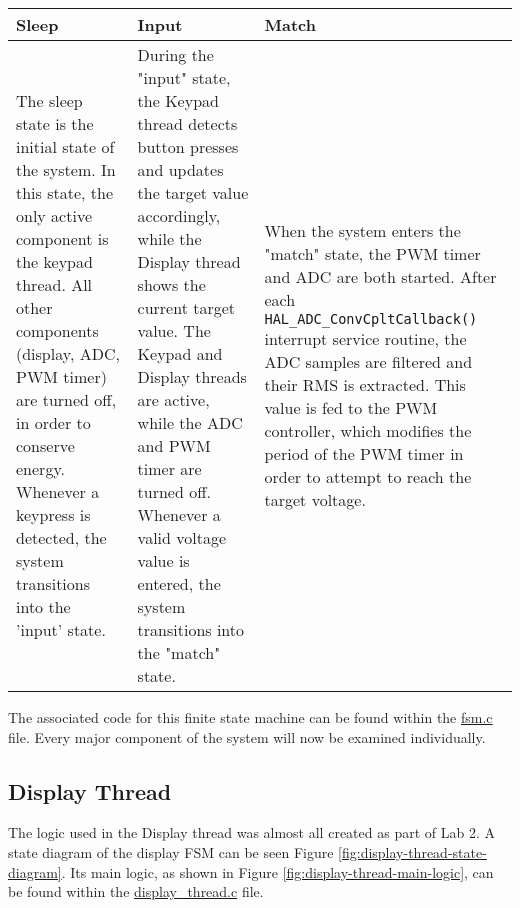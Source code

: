\begin{tabular}{ p{} | p{} | p{}}
Sleep & Input & Match \\
\hline
The sleep state is the initial state of the system. In this state, the only active component is the keypad thread. All other components (display, ADC, PWM timer) are turned off, in order to conserve energy. Whenever a keypress is detected, the system transitions into the 'input' state.
&
During the "input" state, the Keypad thread detects button presses and updates the target value accordingly, while the Display thread shows the current target value. The Keypad and Display threads are active, while the ADC and PWM timer are turned off. Whenever a valid voltage value is entered, the system transitions into the "match" state.
&
When the system enters the "match" state, the PWM timer and ADC are both started. After each \verb|HAL_ADC_ConvCpltCallback()| interrupt service routine, the ADC samples are filtered and their RMS is extracted. This value is fed to the PWM controller, which modifies the period of the PWM timer in order to attempt to reach the target voltage.
\end{tabular}


The associated code for this finite state machine can be found within the \href{https://github.com/lebrice/MicroP/blob/master/Lab4/Src/fsm.c}{fsm.c} file. Every major component of the system will now be examined individually.


\subsection{Display Thread}
\def \DISPLAYREFRESHINTERVAL {8ms}


The logic used in the Display thread was almost all created as part of Lab 2. A state diagram of the display FSM can be seen Figure \ref{fig:display-thread-state-diagram}. Its main logic, as shown in Figure \ref{fig:display-thread-main-logic}, can be found within the \href{https://github.com/lebrice/MicroP/blob/master/Lab4/Src/display_thread.c}{display\_thread.c} file.  


